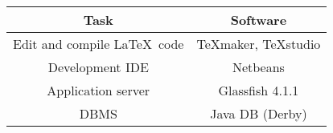 \begin{center}
	
	\-\\
	\begin{tabular}{*{2}{c}}
		\toprule
		Task & Software \\
		\midrule
		Edit and compile \LaTeX\ code & TeXmaker, TeXstudio\\
		Development IDE & Netbeans\\
		Application server & Glassfish 4.1.1\\
		DBMS & Java DB (Derby)\\
		\bottomrule
	\end{tabular}
\end{center}